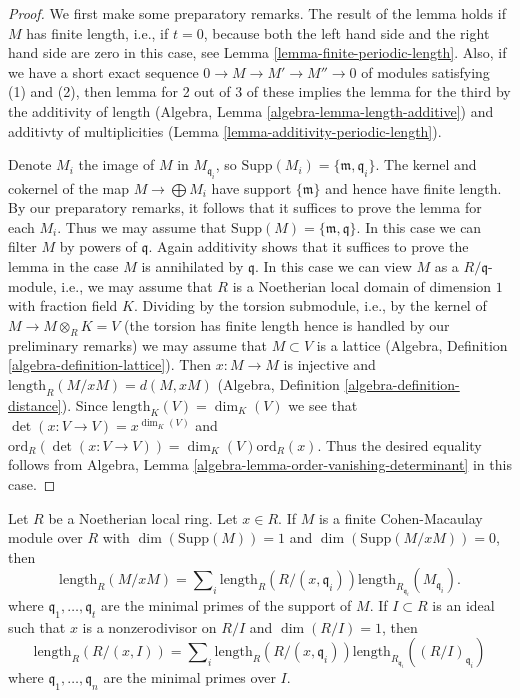 \begin{proof}
We first make some preparatory remarks.
The result of the lemma holds if $M$ has finite length, i.e., if $t = 0$,
because both the left hand side and the right hand side are zero
in this case, see Lemma \ref{lemma-finite-periodic-length}.
Also, if we have a short exact sequence $0 \to M \to M' \to M'' \to 0$
of modules satisfying (1) and (2), then lemma for 2 out of 3
of these implies the lemma for the third by the
additivity of length (Algebra, Lemma \ref{algebra-lemma-length-additive}) and
additivty of multiplicities (Lemma \ref{lemma-additivity-periodic-length}).

\medskip\noindent
Denote $M_i$ the image of $M$ in $M_{\mathfrak q_i}$, so
$\text{Supp}(M_i) = \{\mathfrak m, \mathfrak q_i\}$.
The kernel and cokernel of the map $M \to \bigoplus M_i$
have support $\{\mathfrak m\}$ and hence have finite length.
By our preparatory remarks, it follows that it suffices to
prove the lemma for each $M_i$. Thus we may assume that
$\text{Supp}(M) = \{\mathfrak m, \mathfrak q\}$.
In this case we can filter $M$ by powers of $\mathfrak q$.
Again additivity shows that it suffices to prove the lemma
in the case $M$ is annihilated by $\mathfrak q$.
In this case we can view $M$ as a $R/\mathfrak q$-module,
i.e., we may assume that $R$ is a Noetherian local domain
of dimension $1$ with fraction field $K$.
Dividing by the torsion submodule, i.e., by the
kernel of $M \to M \otimes_R K = V$ (the torsion has
finite length hence is handled by our preliminary remarks)
we may assume that $M \subset V$ is a lattice
(Algebra, Definition \ref{algebra-definition-lattice}).
Then $x : M \to M$ is injective and
$\text{length}_R(M/xM) = d(M, xM)$
(Algebra, Definition \ref{algebra-definition-distance}). Since
$\text{length}_K(V) = \dim_K(V)$
we see that $\det(x : V \to V) = x^{\dim_K(V)}$ and
$\text{ord}_R(\det(x : V \to V)) = \dim_K(V) \text{ord}_R(x)$.
Thus the desired equality follows from
Algebra, Lemma \ref{algebra-lemma-order-vanishing-determinant}
in this case.
\end{proof}

\begin{lemma}
\label{lemma-additivity-divisors-restricted}
Let $R$ be a Noetherian local ring.
Let $x \in R$. If $M$ is a finite Cohen-Macaulay module over $R$
with $\dim(\text{Supp}(M)) = 1$ and $\dim(\text{Supp}(M/xM)) = 0$, then
$$
\text{length}_R(M/xM)
=
\sum\nolimits_i \text{length}_R(R/(x, \mathfrak q_i))
\text{length}_{R_{\mathfrak q_i}}(M_{\mathfrak q_i}).
$$
where $\mathfrak q_1, \ldots, \mathfrak q_t$ are the
minimal primes of the support of $M$. If $I \subset R$ is an ideal
such that $x$ is a nonzerodivisor on $R/I$ and $\dim(R/I) = 1$, then
$$
\text{length}_R(R/(x, I))
=
\sum\nolimits_i \text{length}_R(R/(x, \mathfrak q_i))
\text{length}_{R_{\mathfrak q_i}}((R/I)_{\mathfrak q_i})
$$
where $\mathfrak q_1, \ldots, \mathfrak q_n$ are the minimal
primes over $I$.
\end{lemma}

